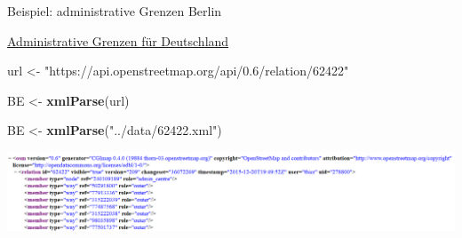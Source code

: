 \documentclass[ignorenonframetext,]{beamer}
\newenvironment{Shaded}{\begin{snugshade}}{\end{snugshade}}
\newcommand{\KeywordTok}[1]{\textcolor[rgb]{0.13,0.29,0.53}{\textbf{#1}}}
\newcommand{\StringTok}[1]{\textcolor[rgb]{0.31,0.60,0.02}{#1}}
\newcommand{\NormalTok}[1]{#1}
\begin{document}
\begin{frame}[fragile]{Beispiel: administrative Grenzen Berlin}

\href{http://wiki.openstreetmap.org/wiki/DE:Grenze\#Bundesl.C3.A4ndergrenze_-_admin_level.3D4}{Administrative
Grenzen für Deutschland}

\begin{Shaded}
\begin{Highlighting}[]
\NormalTok{url <-}\StringTok{ "https://api.openstreetmap.org/api/0.6/relation/62422"}
\end{Highlighting}
\end{Shaded}

\begin{Shaded}
\begin{Highlighting}[]
\NormalTok{BE <-}\StringTok{ }\KeywordTok{xmlParse}\NormalTok{(url)}
\end{Highlighting}
\end{Shaded}

\begin{Shaded}
\begin{Highlighting}[]
\NormalTok{BE <-}\StringTok{ }\KeywordTok{xmlParse}\NormalTok{(}\StringTok{"../data/62422.xml"}\NormalTok{)}
\end{Highlighting}
\end{Shaded}

\includegraphics{figure/ExampleAdmBE.PNG}

\end{frame}
\end{document}
